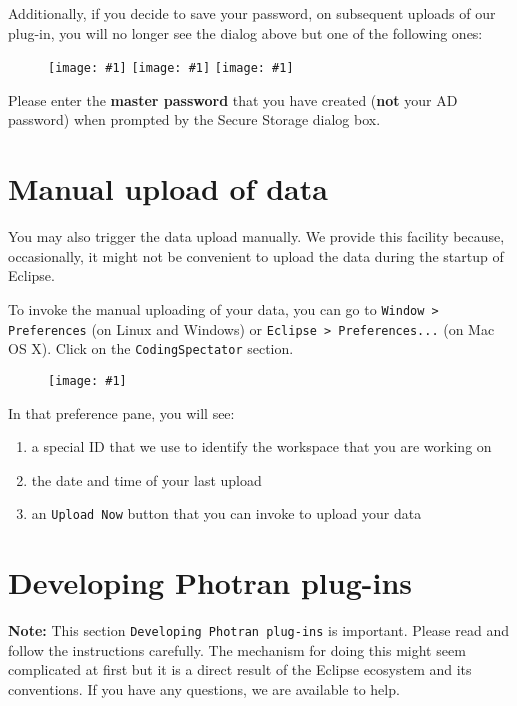 \documentclass{article}
\newcommand\fig[1]{\texttt{[image: \#1]}}
\newcommand\codspec{CodingSpectator}
\newcommand\warnnote[1]{\textbf{Note: }#1}
\newcommand\uiref[1]{\texttt{#1}}
\begin{document}
Additionally, if you decide to save your password, on subsequent uploads of our
plug-in, you will no longer see the dialog above but one of the following ones:

\begin{figure}
%
\centering
%
\fig{figs/keychain}
%
\fig{figs/windows}
%
\fig{figs/LinuxMasterPasswordDialog}
%
\end{figure}

Please enter the \textbf{master password} that you have created (\textbf{not}
your AD password) when prompted by the Secure Storage dialog box.

\section{Manual upload of data}

You may also trigger the data upload manually. We provide this facility because,
occasionally, it might not be convenient to upload the data during the startup
of Eclipse.

To invoke the manual uploading of your data, you can go to \uiref{Window >
Preferences} (on Linux and Windows) or \uiref{Eclipse > Preferences...} (on Mac
OS X). Click on the \uiref{\codspec} section.

\begin{figure}
%
\centering
%
\fig{figs/preferences}
%
\end{figure}

In that preference pane, you will see:

\begin{enumerate}
%
\item a special ID that we use to identify the workspace that you are working on
%
\item the date and time of your last upload
%
\item an \uiref{Upload Now} button that you can invoke to upload your data
%
\end{enumerate}

\section{Developing Photran plug-ins}

\warnnote{This section \uiref{Developing Photran plug-ins} is important. Please
read and follow the instructions carefully. The mechanism for doing this might
seem complicated at first but it is a direct result of the Eclipse ecosystem and
its conventions. If you have any questions, we are available to help.}
\end{document}
